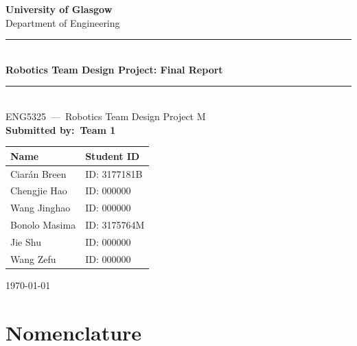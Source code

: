 \documentclass[12pt, a4paper]{report}
\newcommand{\reporttitle}{Robotics Team Design Project: Final Report}
\newcommand{\modulecode}{ENG5325}
\newcommand{\modulename}{Robotics Team Design Project M}
\newcommand{\institution}{University of Glasgow}
\newcommand{\department}{Department of Engineering}
\newcommand{\teamname}{Team 1}
\newcommand{\reportdate}{\today}
\newcommand{\memberOne}{Ciarán Breen}     \newcommand{\memberOneID}{ID: 3177181B}
\newcommand{\memberTwo}{Chengjie Hao}     \newcommand{\memberTwoID}{ID: 000000}
\newcommand{\memberThree}{Wang Jinghao}   \newcommand{\memberThreeID}{ID: 000000}
\newcommand{\memberFour}{Bonolo Masima}    \newcommand{\memberFourID}{ID: 3175764M}
\newcommand{\memberFive}{Jie Shu}    \newcommand{\memberFiveID}{ID: 000000}
\newcommand{\memberSix}{Wang Zefu}     \newcommand{\memberSixID}{ID: 000000}
\begin{document}

\begin{titlepage}
  \centering
  \vspace*{1cm}

  {\Large\textbf{\institution}}\\[0.3cm]
  {\large\department}\\[2cm]

  \rule{\textwidth}{1.5pt}\\[0.5cm]
  {\Huge\textbf{\reporttitle}}\\[0.5cm]
  \rule{\textwidth}{1.5pt}\\[1.5cm]

  {\large\modulecode\ —\ \modulename}\\[1.5cm]

  {\large\textbf{Submitted by:\ \teamname}}\\[1cm]

  \begin{tabular}{ll}
    \toprule
    \textbf{Name} & \textbf{Student ID} \\
    \midrule
    \memberOne   & \memberOneID   \\
    \memberTwo   & \memberTwoID   \\
    \memberThree & \memberThreeID \\
    \memberFour  & \memberFourID  \\
    \memberFive  & \memberFiveID  \\
    \memberSix   & \memberSixID   \\
    \bottomrule
  \end{tabular}

  \vfill
  {\large\reportdate}
\end{titlepage}

\newpage
{}

\tableofcontents

\newpage
\listoffigures
{}

\newpage
\listoftables
{}

\newpage
\chapter*{Nomenclature}
\end{document}
